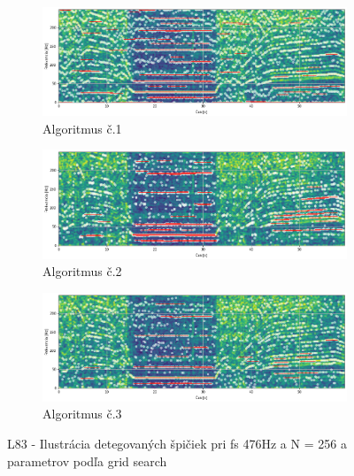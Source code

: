 \begin{figure}[h]
	\centering
     \begin{subfigure}{\textwidth}
        \centering
     	\includegraphics[width=\textwidth]{figures/verification/L83-dataset-A1.png}
     	\caption{Algoritmus č.1}
     \end{subfigure}
     \begin{subfigure}{\textwidth}
    	\centering
        \includegraphics[width=\textwidth]{figures/verification/L83-dataset-A2.png}
        \caption{Algoritmus č.2}
     \end{subfigure}
      \begin{subfigure}{\textwidth}
    	\centering
        \includegraphics[width=\textwidth]{figures/verification/L83-dataset-A3.png}
        \caption{Algoritmus č.3}
     \end{subfigure}
     \caption{L83 - Ilustrácia detegovaných špičiek pri fs 476Hz a N = 256 a parametrov podľa grid search}
\end{figure}
